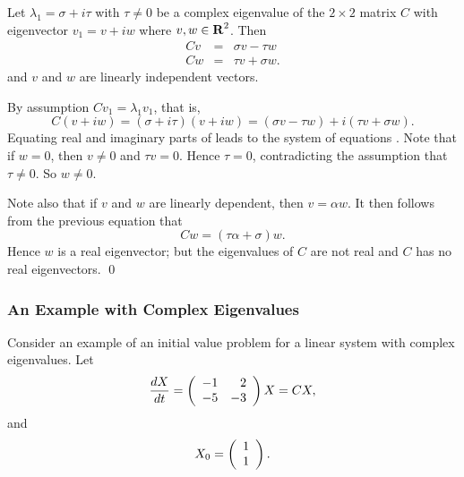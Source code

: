 \begin{lemma}  \label{L:rievind}
Let $\lambda_1=\sigma+i\tau$ with $\tau\neq 0$ be a
complex eigenvalue of the
$2\times 2$ matrix $C$ with eigenvector
$v_1=v+iw$ where $v,w\in\mbox{$\bf{R}$}^2$.  Then
\begin{equation}  \label{e:complexcoord}
\begin{array}{rcl}
Cv & = & \sigma v - \tau w \\
Cw & = & \tau v + \sigma w.
\end{array}
\end{equation}
and $v$ and $w$ are linearly independent vectors.
\end{lemma}

\proof   By assumption $Cv_1=\lambda_1v_1$, that is,
\begin{equation}  \label{E:viw}
C (v+iw) = (\sigma+i\tau)(v+iw) = (\sigma v - \tau w) + i(\tau v + \sigma w).
\end{equation}
Equating real and imaginary parts of  leads to the system of
equations .  Note that if $w=0$, then $v\neq 0$ and
$\tau v = 0$.  Hence $\tau=0$, contradicting the assumption that
$\tau\neq 0$.  So $w\neq 0$.

Note also that if $v$ and $w$ are linearly dependent, then $v=\alpha w$.
It then follows from the previous equation that
\[
Cw = (\tau\alpha+\sigma)w.
\]
Hence $w$ is a real eigenvector; but the eigenvalues of $C$ are not real and
$C$ has no real eigenvectors.   \qed


\subsubsection*{An Example with Complex Eigenvalues}

Consider an example of an initial value problem for a linear system with
complex eigenvalues.  Let
\begin{equation}  \label{e:complexexample}
\frac{dX}{dt} = \left(\begin{array}{rr} -1 & 2\\ -5 &-3\end{array}\right) X = CX,
\end{equation}
and
\[
X_0=\left(\begin{array}{r} 1 \\ 1\end{array}\right).
\]

